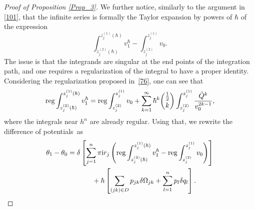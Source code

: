 \documentclass[pdftex]{sigma}
\numberwithin{equation}{section}
\theoremstyle{definition}
\begin{document}
\begin{proof}[Proof of Proposition \ref{Prop_3}]
We further notice, similarly to the argument in \eqref{101}, that the infinite series is formally the Taylor expansion by powers of $\hbar$ of the expression
\begin{equation*}%
\int^{z^{(1)}_j(\hbar)}_{z^{(2)}_j(\hbar)}v^\hbar_1 - \int^{z^{(1)}_j}_{z^{(2)}_j}v_0 .
\end{equation*}
The issue is that the integrands are singular at the end points of the integration path, and one requires a regularization of the integral to have a proper identity.
Considering the regularization proposed in~\eqref{76}, one can see that
\begin{equation*}%
{\rm reg}\int^{z^{(1)}_j(\hbar)}_{z^{(2)}_j(\hbar)}v^\hbar_1 ={\rm reg}\int^{z^{(1)}_j}_{z^{(2)}_j}v_0 + \sum^{\infty}_{k=1}\hbar^k \binom{\frac{1}{2}}{k}\int^{z^{(1)}_j}_{z^{(2)}_j}\frac{\tilde{Q}^k}{v_0^{2k-1}} ,
\end{equation*}
where the integrals near $h^n$ are already regular.
Using that, we rewrite the difference of potentials~as
\begin{gather}
\theta_1- \theta_0=\delta\left[\sum^n_{j=1}
\pi {\rm i} r_j \left({\rm reg}\int^{z^{(1)}_j(\hbar)}_{z^{(2)}_j(\hbar)}v^\hbar_1 - {\rm reg}\int^{z^{(1)}_j}_{z^{(2)}_j}v_0 \right)\right] \nonumber\\
\hphantom{\theta_1- \theta_0=}{}
+ \hbar \left[\sum_{(jk) \in D}p_{jk} \delta \Omega_{jk}+ \sum^n_{l=1} p_l \delta q_l \right].\label{129}
 \end{gather}


\end{proof}
\end{document}
